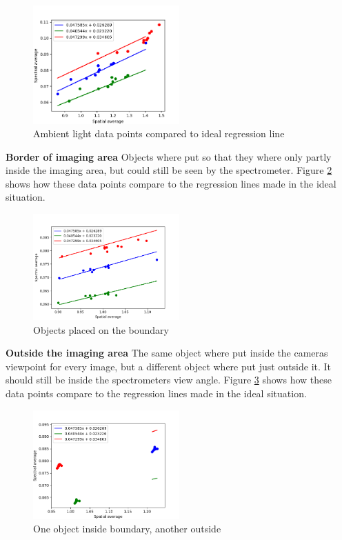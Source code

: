 \begin{figure}[h]
    \centering
    \includegraphics[width=0.5\textwidth]{Plots/spectral_vs_spatial_average_with_regression_ambient_light.png}
    \caption{Ambient light data points compared to ideal regression line}
    \label{fig:ambient_light_plot}
\end{figure}

\textbf{Border of imaging area}
Objects where put so that they where only partly inside the imaging area, but could still be seen by the spectrometer. Figure \ref{fig:boundary_objects_plot} shows how these data points compare to the regression lines made in the ideal situation.

\begin{figure}[h]
    \centering
    \includegraphics[width=0.5\textwidth]{Plots/spectral_vs_spatial_average_with_regression_boundary_objects.png}
    \caption{Objects placed on the boundary}
    \label{fig:boundary_objects_plot}
\end{figure}

\textbf{Outside the imaging area}
The same object where put inside the cameras viewpoint for every image, but a different object where put just outside it. It should still be inside the spectrometers view angle. Figure \ref{fig:outside_objects_plot} shows how these data points compare to the regression lines made in the ideal situation.

\begin{figure}[h]
    \centering
    \includegraphics[width=0.5\textwidth]{Plots/spectral_vs_spatial_average_with_regression_outside_objects.png}
    \caption{One object inside boundary, another outside}
    \label{fig:outside_objects_plot}
\end{figure}

